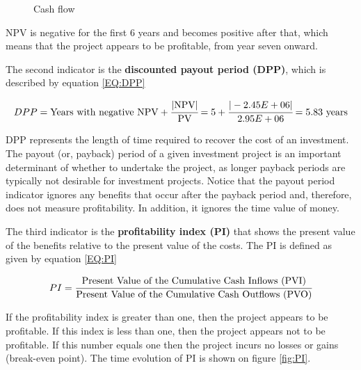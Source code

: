 \begin{enumerate}[label=\textbf{Step \arabic{enumi}}:,ref=Step \arabic{enumi}]
\begin{figure}[h!]
	\caption{Cash flow}
	\label{fig:CashFlow}
	\end{figure}

	NPV is negative for the first 6 years and becomes positive after that, which means that the project appears to be profitable, from year seven onward.
	
	The second indicator is the \textbf{discounted payout period (DPP)}, which is described by equation \ref{EQ:DPP}
	
	{\footnotesize
	\begin{equation}
		DPP = \text{Years with negative NPV} + \cfrac{\text{|NPV|}}{\text{PV}} = 5 + \cfrac{|-2.45E+06|}{2.95E+06} = 5.83~\text{years}
		\label{EQ:DPP}
	\end{equation} }

	DPP	represents the length of time required to recover the cost of an investment. The payout (or, payback) period of a given investment project is an important determinant of whether to undertake the project, as longer payback periods are typically not desirable for investment projects. Notice that the payout period indicator ignores any benefits that occur after the payback period and, therefore, does not measure profitability. In addition, it ignores the time value of money.
	
	The third indicator is the \textbf{profitability index (PI)} that shows the present value of the benefits relative to the present value	of the costs. The PI is defined as given by equation \ref{EQ:PI}
	
	\begin{equation}
		PI = \cfrac{\text{Present Value of the Cumulative Cash Inflows (PVI)}}{\text{Present Value of the Cumulative Cash Outflows (PVO)}}
		\label{EQ:PI}
	\end{equation}
	
	If the profitability index is greater than one, then the project appears to be profitable. If this index is less than one, then the project appears not to be profitable. If this number equals one then the project incurs no losses or gains (break-even point). The time evolution of PI is shown on figure \ref{fig:PI}.
	

\end{enumerate}
